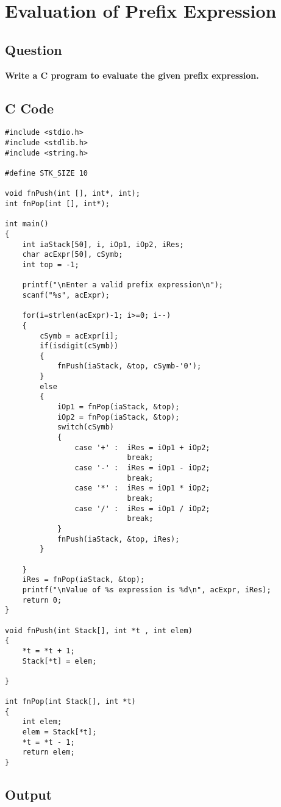 \chapter{Evaluation of Prefix Expression}
\section*{Question}
{\selectfont \textbf{Write a C program to evaluate the given prefix expression.
}}

\section*{C Code}

\begin{Verbatim}
#include <stdio.h>
#include <stdlib.h>
#include <string.h>

#define STK_SIZE 10

void fnPush(int [], int*, int);
int fnPop(int [], int*);

int main()
{
	int iaStack[50], i, iOp1, iOp2, iRes;
	char acExpr[50], cSymb;
	int top = -1;
	
	printf("\nEnter a valid prefix expression\n");
	scanf("%s", acExpr);
	
	for(i=strlen(acExpr)-1; i>=0; i--)
	{
		cSymb = acExpr[i];
		if(isdigit(cSymb))
		{
			fnPush(iaStack, &top, cSymb-'0');
		}
		else
		{
			iOp1 = fnPop(iaStack, &top);
			iOp2 = fnPop(iaStack, &top);
			switch(cSymb)
			{
				case '+' : 	iRes = iOp1 + iOp2;
							break;
				case '-' : 	iRes = iOp1 - iOp2;
							break;
				case '*' : 	iRes = iOp1 * iOp2;
							break;
				case '/' : 	iRes = iOp1 / iOp2;
							break;
			}
			fnPush(iaStack, &top, iRes);	
		}

	}
	iRes = fnPop(iaStack, &top);
	printf("\nValue of %s expression is %d\n", acExpr, iRes);
	return 0;	
}

void fnPush(int Stack[], int *t , int elem)
{
	*t = *t + 1;
	Stack[*t] = elem;
	
}

int fnPop(int Stack[], int *t)
{
	int elem;
	elem = Stack[*t];
	*t = *t - 1;
	return elem;
}

\end{Verbatim}

\section*{Output}
\begin{Verbatim}



\end{Verbatim}


